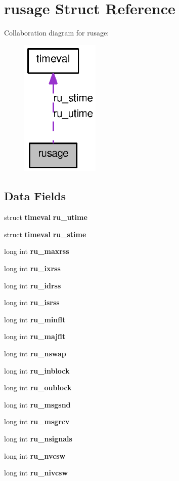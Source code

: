 \section{rusage Struct Reference}
\label{structrusage}


Collaboration diagram for rusage:
\nopagebreak
\begin{figure}[H]
\begin{center}
\leavevmode
\includegraphics[width=106pt]{structrusage__coll__graph}
\end{center}
\end{figure}
\subsection*{Data Fields}
\begin{DoxyCompactItemize}
\item 
struct {\bf timeval} {\bf ru\_\-utime}
\item 
struct {\bf timeval} {\bf ru\_\-stime}
\item 
long int {\bf ru\_\-maxrss}
\item 
long int {\bf ru\_\-ixrss}
\item 
long int {\bf ru\_\-idrss}
\item 
long int {\bf ru\_\-isrss}
\item 
long int {\bf ru\_\-minflt}
\item 
long int {\bf ru\_\-majflt}
\item 
long int {\bf ru\_\-nswap}
\item 
long int {\bf ru\_\-inblock}
\item 
long int {\bf ru\_\-oublock}
\item 
long int {\bf ru\_\-msgsnd}
\item 
long int {\bf ru\_\-msgrcv}
\item 
long int {\bf ru\_\-nsignals}
\item 
long int {\bf ru\_\-nvcsw}
\item 
long int {\bf ru\_\-nivcsw}
\end{DoxyCompactItemize}


